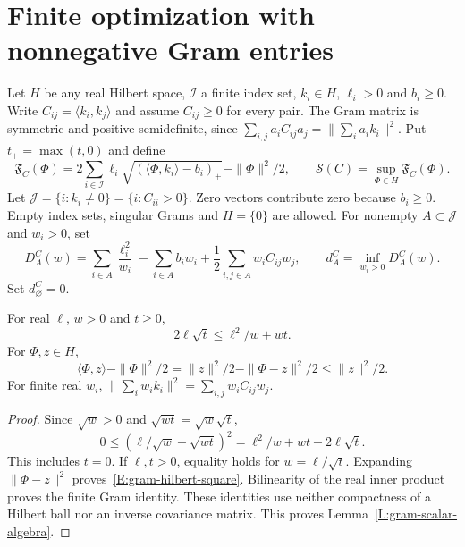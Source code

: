 \section{Finite optimization with nonnegative Gram entries}
\label{S:finite-positive-gram}

Let $H$ be any real Hilbert space, $\mathcal{I}$ a finite index set, $k_i \in
H$, $\ell_i > 0$ and $b_i \ge 0$. Write $C_{ij} = \langle k_i,k_j\rangle$ and
assume $C_{ij} \ge 0$ for every pair. The Gram matrix is symmetric and positive
semidefinite, since $\sum_{i,j}a_iC_{ij}a_j = \|\sum_i a_i k_i\|^2$. Put $t_+ =
\max(t,0)$ and define
\begin{equation}\label{E:finite-gram-score}
  \mathfrak{F}_C(\Phi)
  =2\sum_{i\in\mathcal{I}}\ell_i
  \sqrt{(\langle\Phi,k_i\rangle-b_i)_+}-\|\Phi\|^2/2,
  \qquad \mathscr{S}(C)=\sup_{\Phi\in H}\mathfrak{F}_C(\Phi).
\end{equation}
Let $\mathcal{J} = \{i:k_i\ne0\} = \{i:C_{ii}>0\}$. Zero vectors contribute zero
because $b_i \ge 0$. Empty index sets, singular Grams and $H = \{0\}$ are
allowed. For nonempty $A \subset \mathcal{J}$ and $w_i > 0$, set
\begin{equation}\label{E:finite-gram-dual}
  D_A^C(w)=\sum_{i\in A}\frac{\ell_i^2}{w_i}
  -\sum_{i\in A}b_iw_i
  +\frac12\sum_{i,j\in A}w_iC_{ij}w_j,
  \qquad d_A^C=\inf_{w_i>0}D_A^C(w).
\end{equation}
Set $d_\varnothing^C = 0$.

\begin{lemma}\label{L:gram-scalar-algebra}
  For real $\ell$, $w > 0$ and $t \ge 0$,
  \begin{equation}\label{E:gram-sqrt-dual}
    2\ell\sqrt t\le\ell^2/w+wt.
  \end{equation}
  For $\Phi,z \in H$,
  \begin{equation}\label{E:gram-hilbert-square}
    \langle\Phi,z\rangle-\|\Phi\|^2/2
    =\|z\|^2/2-\|\Phi-z\|^2/2\le\|z\|^2/2.
  \end{equation}
  For finite real $w_i$, $\|\sum_iw_ik_i\|^2 = \sum_{i,j}w_iC_{ij}w_j$.
\end{lemma}

\begin{proof}
  Since $\sqrt w > 0$ and $\sqrt{wt} = \sqrt w\sqrt t$,
  \[
    0\le(\ell/\sqrt w-\sqrt{wt})^2
    =\ell^2/w+wt-2\ell\sqrt t.
  \]
  This includes $t = 0$. If $\ell,t > 0$, equality holds for $w = \ell/\sqrt t$.
  Expanding $\|\Phi-z\|^2$ proves~\eqref{E:gram-hilbert-square}. Bilinearity of
  the real inner product proves the finite Gram identity. These identities use
  neither compactness of a Hilbert ball nor an inverse covariance matrix. This
  proves Lemma~\ref{L:gram-scalar-algebra}.
\end{proof}

